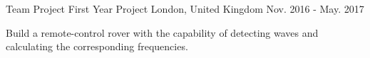 \begin{cventries}
    \cventry
    {Team Project} %
    {First Year Project} %
    {London, United Kingdom} %
    {Nov. 2016 - May. 2017} %
    {
      \begin{cvitems} %
        \item {Build a remote-control rover with the capability of detecting waves and calculating the corresponding frequencies.}
      \end{cvitems}
    }

\end{cventries}